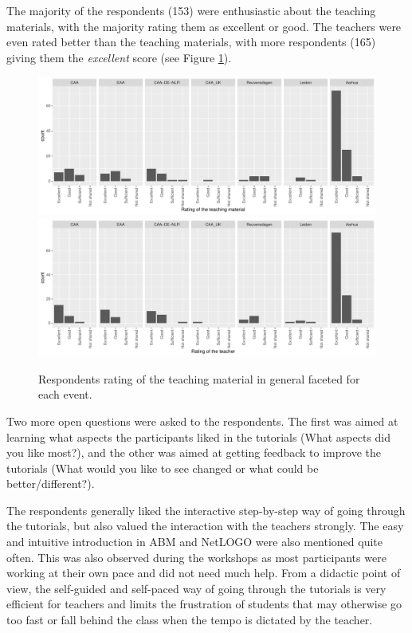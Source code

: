 \documentclass[
]{article}
\begin{document}
The majority of the respondents (153) were enthusiastic about the teaching materials, with the majority rating them as excellent or good. The teachers were even rated better than the teaching materials, with more respondents (165) giving them the \emph{excellent} score (see Figure \ref{fig:rating-teaching}).

\begin{figure}
\includegraphics[height=0.5\textheight]{paper_files/figure-latex/rating-teaching-1} \includegraphics[height=0.5\textheight]{paper_files/figure-latex/rating-teaching-2} \caption{Respondents rating of the teaching material in general faceted for each event.}\label{fig:rating-teaching}
\end{figure}

Two more open questions were asked to the respondents. The first was aimed at learning what aspects the participants liked in the tutorials (What aspects did you like most?), and the other was aimed at getting feedback to improve the tutorials (What would you like to see changed or what could be better/different?).

The respondents generally liked the interactive step-by-step way of going through the tutorials, but also valued the interaction with the teachers strongly. The easy and intuitive introduction in ABM and NetLOGO were also mentioned quite often. This was also observed during the workshops as most participants were working at their own pace and did not need much help. From a didactic point of view, the self-guided and self-paced way of going through the tutorials is very efficient for teachers and limits the frustration of students that may otherwise go too fast or fall behind the class when the tempo is dictated by the teacher.
\end{document}
